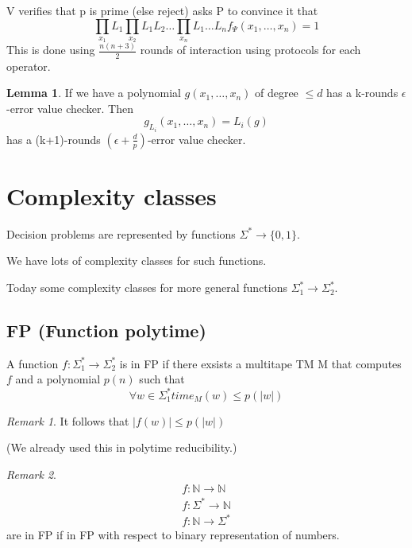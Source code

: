 \documentclass[a4paper,12pt]{article}
\theoremstyle{definition}
\newtheorem{lemma}[counter]{Lemma}
\theoremstyle{remark}
\newtheorem*{remark}{Remark}
\newcommand{\N}{\mathbb{N}}
\begin{document}
V verifies that p is prime (else reject)
asks P to convince it that
\begin{equation*}
    \prod_{x_1} L_1 \prod_{x_2} L_1 L_2 \dots \prod_{x_n} L_1 \dots L_n f_\Psi (x_1, \dots, x_n) = 1 %
\end{equation*}
This is done using $\frac{n (n + 3)}{2}$ rounds of interaction using protocols for each operator.

\begin{lemma}
    If we have a polynomial $g(x_1, \dots, x_n)$ of degree $\leq d$ has a k-rounds $\epsilon$-error value checker.
    Then 
    \begin{equation*}
        g_{L_i} (x_1, \dots, x_n) = L_i(g)
    \end{equation*}
    has a (k+1)-rounds $(\epsilon + \frac{d}{p})$-error value checker.
\end{lemma}

\section{Complexity classes}
Decision problems are represented by functions $\Sigma^* \to \{0, 1\}$.

We have lots of complexity classes for such functions.

Today some complexity classes for more general functions $\Sigma_1^* \to \Sigma_2^*$.

\subsection{FP (Function polytime)}
A function $f: \Sigma_1^* \to \Sigma_2^*$ is in FP if there exsists a multitape TM M that 
computes $f$ and a polynomial $p(n)$ such that
\begin{equation*}
    \forall w \in \Sigma_1^* time_M(w) \leq p(|w|)
\end{equation*}

\begin{remark}
    It follows that $|f(w)| \leq p(|w|)$
\end{remark}

(We already used this in polytime reducibility.)

\begin{remark}
    \begin{gather*}
        f: \N \to \N \\
        f: \Sigma^* \to \N \\
        f: \N \to \Sigma^*
    \end{gather*}
    are in FP if in FP with respect to binary representation of numbers.
\end{remark}
\end{document}

